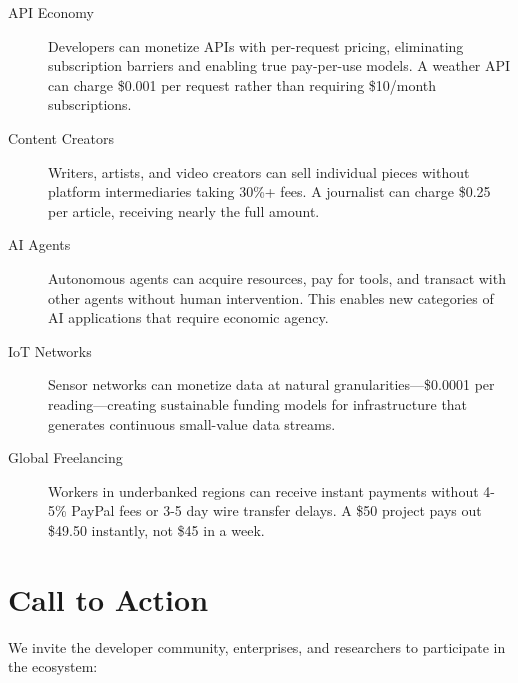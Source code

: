 \begin{description}
    \item[API Economy] Developers can monetize APIs with per-request pricing, eliminating subscription barriers and enabling true pay-per-use models. A weather API can charge \$0.001 per request rather than requiring \$10/month subscriptions.

    \item[Content Creators] Writers, artists, and video creators can sell individual pieces without platform intermediaries taking 30\%+ fees. A journalist can charge \$0.25 per article, receiving nearly the full amount.

    \item[AI Agents] Autonomous agents can acquire resources, pay for tools, and transact with other agents without human intervention. This enables new categories of AI applications that require economic agency.

    \item[IoT Networks] Sensor networks can monetize data at natural granularities---\$0.0001 per reading---creating sustainable funding models for infrastructure that generates continuous small-value data streams.

    \item[Global Freelancing] Workers in underbanked regions can receive instant payments without 4-5\% PayPal fees or 3-5 day wire transfer delays. A \$50 project pays out \$49.50 instantly, not \$45 in a week.
\end{description}

\section{Call to Action}
\label{sec:call-to-action}

We invite the developer community, enterprises, and researchers to participate in the \tprotocol{} ecosystem:


